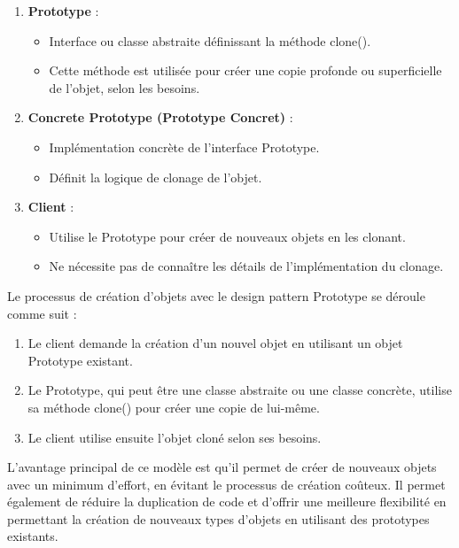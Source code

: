 \documentclass[french]{article}
\begin{document}
\begin{enumerate}
    \item \textbf{Prototype} :
    \begin{itemize}
        \item Interface ou classe abstraite définissant la méthode clone().
        \item Cette méthode est utilisée pour créer une copie profonde ou superficielle de l'objet, selon les besoins.
    \end{itemize}
    
    \item \textbf{Concrete Prototype (Prototype Concret)} :
    \begin{itemize}
        \item Implémentation concrète de l'interface Prototype.
        \item Définit la logique de clonage de l'objet.
    \end{itemize}
    
    \item \textbf{Client} :
    \begin{itemize}
        \item Utilise le Prototype pour créer de nouveaux objets en les clonant.
        \item Ne nécessite pas de connaître les détails de l'implémentation du clonage.
    \end{itemize}
\end{enumerate}

Le processus de création d'objets avec le design pattern Prototype se déroule comme suit :

\begin{enumerate}
    \item Le client demande la création d'un nouvel objet en utilisant un objet Prototype existant.
    \item Le Prototype, qui peut être une classe abstraite ou une classe concrète, utilise sa méthode clone() pour créer une copie de lui-même.
    \item Le client utilise ensuite l'objet cloné selon ses besoins.
\end{enumerate}

L'avantage principal de ce modèle est qu'il permet de créer de nouveaux objets avec un minimum d'effort, en évitant le processus de création coûteux. Il permet également de réduire la duplication de code et d'offrir une meilleure flexibilité en permettant la création de nouveaux types d'objets en utilisant des prototypes existants.
\end{document}

